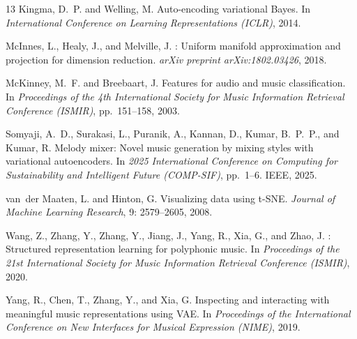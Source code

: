 \documentclass[11pt]{article}
\begin{document}
\begin{thebibliography}{13}
Kingma, D.~P. and Welling, M.
\newblock Auto-encoding variational {B}ayes.
\newblock In \emph{International Conference on Learning Representations (ICLR)}, 2014.

McInnes, L., Healy, J., and Melville, J.
: Uniform manifold approximation and projection for dimension reduction.
\newblock \emph{arXiv preprint arXiv:1802.03426}, 2018.

McKinney, M.~F. and Breebaart, J.
\newblock Features for audio and music classification.
\newblock In \emph{Proceedings of the 4th International Society for Music Information Retrieval Conference (ISMIR)}, pp.~151--158, 2003.

Somyaji, A.~D., Surakasi, L., Puranik, A., Kannan, D., Kumar, B.~P.~P., and Kumar, R.
\newblock Melody mixer: Novel music generation by mixing styles with variational autoencoders.
\newblock In \emph{2025 International Conference on Computing for Sustainability and Intelligent Future (COMP-SIF)}, pp.~1--6. IEEE, 2025.

van~der Maaten, L. and Hinton, G.
\newblock Visualizing data using {t-SNE}.
\newblock \emph{Journal of Machine Learning Research}, 9: 2579--2605, 2008.

Wang, Z., Zhang, Y., Zhang, Y., Jiang, J., Yang, R., Xia, G., and Zhao, J.
: Structured representation learning for polyphonic music.
\newblock In \emph{Proceedings of the 21st International Society for Music Information Retrieval Conference (ISMIR)}, 2020.

Yang, R., Chen, T., Zhang, Y., and Xia, G.
\newblock Inspecting and interacting with meaningful music representations using {VAE}.
\newblock In \emph{Proceedings of the International Conference on New Interfaces for Musical Expression (NIME)}, 2019.

\end{thebibliography}
\end{document}
